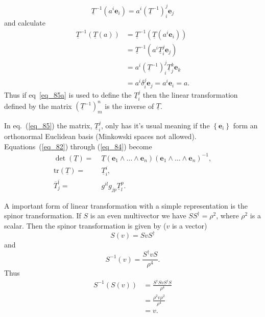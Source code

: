 \documentclass[12pt]{report}
\newcommand{\bm}[1]{\boldsymbol{#1}}
\newcommand{\lp}{\left (}
\newcommand{\rp}{\right )}
\newcommand{\lbrc}{\left \{}
\newcommand{\rbrc}{\right \}}
\newcommand{\set}[1]{\lbrc {#1} \rbrc}
\newcommand{\W}{\wedge}
\newcommand{\R}{\dagger}
\newcommand{\f}[2]{{#1}\lp {#2} \rp}
\newcommand{\paren}[1]{\lp {#1} \rp}
\newcommand{\eb}{\bm{e}}
\newcommand{\tr}{\mbox{tr}}
\begin{document}
\begin{equation}
\underline{T}^{-1}\paren{a^{i}\eb_{i}} = a^{i}\paren{\underline{T}^{-1}}_{i}^{j}\eb_{j}
\end{equation}
and calculate
\begin{align}
	\underline{T}^{-1}\paren{\underline{T}\paren{a}} &= \underline{T}^{-1}\paren{\underline{T}\paren{a^{i}\eb_{i}}} \nonumber \\
		&= \underline{T}^{-1}\paren{a^{i}\underline{T}_{i}^{j}\eb_{j}} \nonumber \\
		&= a^{i}\paren{\underline{T}^{-1}}_{i}^{j} \underline{T}_{j}^{k}\eb_{k} \nonumber \\
		&= a^{i}\delta_{i}^{j}\eb_{j} = a^{i}\eb_{i} = a.
\end{align}
Thus if eq~\ref{eq_85a} is used to define the $\underline{T}_{i}^{j}$ then the linear transformation defined by the matrix $\paren{\underline{T}^{-1}}_{m}^{n}$ is the inverse of $\underline{T}$.

In eq.~(\ref{eq_85}) the matrix, $\underline{T}_{i}^{j}$, only has it's usual meaning if the $\set{\eb_{i}}$ form an orthonormal Euclidean
basis (Minkowski spaces not allowed). Equations~(\ref{eq_82}) through (\ref{eq_84}) become
\begin{align}
    \f{\det}{\underline{T}} =&\; \f{\underline{T}}{\eb_{1}\W\dots\W\eb_{n}}\paren{\eb_{1}\W\dots\W\eb_{n}}^{-1},\\
    \f{\tr}{\underline{T}} =&\; \underline{T}_{i}^{i},\\
    \overline{T}_{j}^{i} =&\;  g^{il}g_{jp}\underline{T}_{l}^{p}.
\end{align}

A important form of linear transformation with a simple representation is the spinor transformation.  If $S$ is an even multivector we have
$SS^{\R} = \rho^{2}$, where $\rho^{2}$ is a scalar.  Then the spinor transformation is given by ($v$ is a vector)
\begin{equation}
	\f{S}{v} = SvS^{\R}
\end{equation}
and
\begin{equation}
	\f{S^{-1}}{v} = \frac{S^{\R}vS}{\rho^{4}}.
\end{equation}
Thus
\begin{align}
	\f{S^{-1}}{\f{S}{v}} &= \frac{S^{\R}SvS^{\R}S}{\rho^{4}} \nonumber \\
	                     &= \frac{\rho^{2}v\rho^{2}}{\rho^{4}} \nonumber \\
	                     &= v. 
\end{align}
\end{document}
